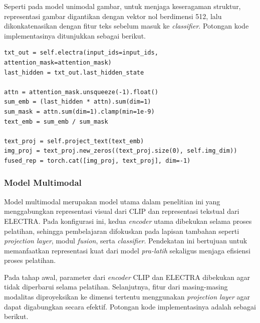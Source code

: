 Seperti pada model unimodal gambar, untuk menjaga keseragaman struktur, representasi gambar digantikan dengan vektor nol berdimensi 512, lalu dikonkatenasikan dengan fitur teks sebelum masuk ke \textit{classifier}. Potongan kode implementasinya ditunjukkan sebagai berikut.

\begin{lstlisting}[caption={Kode implementasi model unimodal teks}, label={code:4.unimodal_teks}]
txt_out = self.electra(input_ids=input_ids, attention_mask=attention_mask)
last_hidden = txt_out.last_hidden_state

attn = attention_mask.unsqueeze(-1).float()
sum_emb = (last_hidden * attn).sum(dim=1)
sum_mask = attn.sum(dim=1).clamp(min=1e-9)
text_emb = sum_emb / sum_mask

text_proj = self.project_text(text_emb)
img_proj = text_proj.new_zeros((text_proj.size(0), self.img_dim))
fused_rep = torch.cat([img_proj, text_proj], dim=-1)
\end{lstlisting}

\subsubsection{Model Multimodal}
\label{IV.Model.Konfigurasi.Multimodal}

Model multimodal merupakan model utama dalam penelitian ini yang menggabungkan representasi visual dari CLIP dan representasi tekstual dari ELECTRA. Pada konfigurasi ini, kedua \textit{encoder} utama dibekukan selama proses pelatihan, sehingga pembelajaran difokuskan pada lapisan tambahan seperti \textit{projection layer}, modul \textit{fusion}, serta \textit{classifier}. Pendekatan ini bertujuan untuk memanfaatkan representasi kuat dari model \textit{pra-latih} sekaligus menjaga efisiensi proses pelatihan.

Pada tahap awal, parameter dari \textit{encoder} CLIP dan ELECTRA dibekukan agar tidak diperbarui selama pelatihan. Selanjutnya, fitur dari masing-masing modalitas diproyeksikan ke dimensi tertentu menggunakan \textit{projection layer} agar dapat digabungkan secara efektif. Potongan kode implementasinya adalah sebagai berikut.

